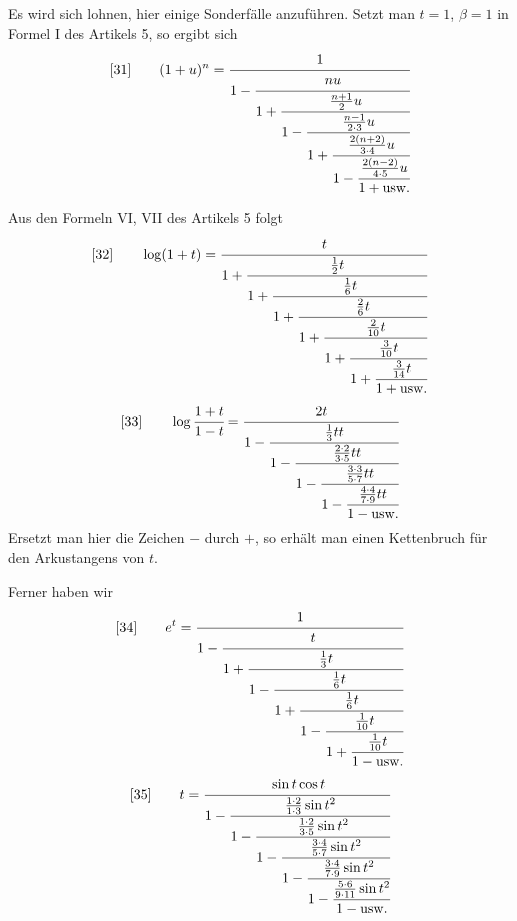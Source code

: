 
Es wird sich lohnen, hier einige Sonderfälle anzuführen. Setzt man $t=1$, $\beta=1$ in Formel I des Artikels 5, so ergibt sich
\[
[31]\qquad
(1+u)^n=
\cfrac{1}{1-\cfrac{nu}{1+\cfrac{\frac{n+1}{2}u}{1-\cfrac{\frac{n-1}{2\cdot3}u}{1+\cfrac{\frac{2(n+2)}{3\cdot4}u}{1-\cfrac{\frac{2(n-2)}{4\cdot5}u}{1+\mathrm{usw.}}}}}}}
\]

Aus den Formeln VI, VII des Artikels 5 folgt
\[
[32]\qquad
\log(1+t)=
\cfrac{t}{1+\cfrac{\frac12t}{1+\cfrac{\frac16t}{1+\cfrac{\frac26t}{1+\cfrac{\frac2{10}t}{1+\cfrac{\frac3{10}t}{1+\cfrac{\frac3{14}t}{1+\mathrm{usw.}}}}}}}}
\]
\[
[33]\qquad
\log\cfrac{1+t}{1-t}=
\cfrac{2t}{1-\cfrac{\frac13tt}{1-\cfrac{\frac{2\cdot2}{3\cdot5}tt}{1-\cfrac{\frac{3\cdot3}{5\cdot7}tt}{1-\cfrac{\frac{4\cdot4}{7\cdot9}tt}{1-\mathrm{usw.}}}}}}
\]
Ersetzt man hier die Zeichen $-$ durch $+$, so erhält man einen Kettenbruch für den Arkustangens von $t$.
\par
Ferner haben wir
\[
[34]\qquad
e^t=
\cfrac{1}{1-\cfrac{t}{1+\cfrac{\frac13t}{1-\cfrac{\frac16t}{1+\cfrac{\frac16t}{1-\cfrac{\frac1{10}t}{1+\cfrac{\frac1{10}t}{1-\mathrm{usw.}}}}}}}}
\]
\[
[35]\qquad
t=
\cfrac{\sin t\cos t}{1-\cfrac{\frac{1\cdot2}{1\cdot3}\sin t^2}{1-\cfrac{\frac{1\cdot2}{3\cdot5}\sin t^2}{1-\cfrac{\frac{3\cdot4}{5\cdot7}\sin t^2}{1-\cfrac{\frac{3\cdot4}{7\cdot9}\sin t^2}{1-\cfrac{\frac{5\cdot6}{9\cdot11}\sin t^2}{1-\mathrm{usw.}}}}}}}
\]

